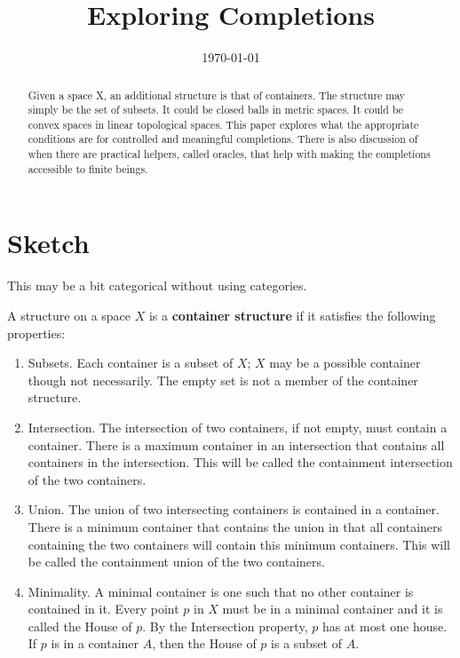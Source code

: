 \documentclass[12pt]{article}
\title{Exploring Completions}
\date{\today}
\begin{document}
\maketitle
\begin{abstract}
Given a space X, an additional structure is that of containers. The structure may simply be the set of subsets. It could be closed balls in metric spaces. It could be convex spaces in linear topological spaces. This paper explores what the appropriate conditions are for controlled and meaningful completions. There is also discussion of when there are practical helpers, called oracles, that help with making the completions accessible to finite beings. 
\end{abstract}

\tableofcontents


\section{Sketch}

This may be a bit categorical without using categories. 

A structure on a space $X$ is a \textbf{container structure} if it satisfies the following properties:
\begin{enumerate}
    \item Subsets. Each container is a subset of $X$; $X$ may be a possible container though not necessarily. The empty set is not a member of the container structure. 
    \item Intersection. The intersection of two containers, if not empty, must contain a container. There is a maximum container in an intersection that contains all containers in the intersection. This will be called the containment intersection of the two containers. 
    \item Union. The union of two intersecting containers is contained in a container. There is a minimum container that contains the union in that all containers containing the two containers will contain this minimum containers. This will be called the containment union of the two containers. 
    \item Minimality. A minimal container is one such that no other container is contained in it. Every point $p$ in $X$ must be in a minimal container and it is called the House of $p$. By the Intersection property, $p$ has at most one house. If $p$ is in a container $A$, then the House of $p$ is a subset of $A$.
\end{enumerate}
\end{document}
